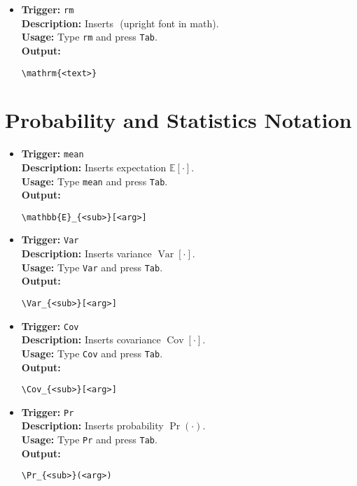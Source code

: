 \documentclass{article}
\DeclareMathOperator{\Var}{Var}
\DeclareMathOperator{\Cov}{Cov}
\begin{document}
\begin{itemize}[leftmargin=*, label={}]
\item \textbf{Trigger:} \texttt{rm} \\
\textbf{Description:} Inserts \(\mathrm{}\) (upright font in math). \\
\textbf{Usage:} Type \texttt{rm} and press \texttt{Tab}. \\
\textbf{Output:}
\begin{verbatim}
\mathrm{<text>}
\end{verbatim}
\end{itemize}

\section{Probability and Statistics Notation}
\begin{itemize}[leftmargin=*, label={}]
\item \textbf{Trigger:} \texttt{mean} \\
\textbf{Description:} Inserts expectation \(\mathbb{E}[\cdot]\). \\
\textbf{Usage:} Type \texttt{mean} and press \texttt{Tab}. \\
\textbf{Output:}
\begin{verbatim}
\mathbb{E}_{<sub>}[<arg>]
\end{verbatim}

\item \textbf{Trigger:} \texttt{Var} \\
\textbf{Description:} Inserts variance \(\Var[\cdot]\). \\
\textbf{Usage:} Type \texttt{Var} and press \texttt{Tab}. \\
\textbf{Output:}
\begin{verbatim}
\Var_{<sub>}[<arg>]
\end{verbatim}

\item \textbf{Trigger:} \texttt{Cov} \\
\textbf{Description:} Inserts covariance \(\Cov[\cdot]\). \\
\textbf{Usage:} Type \texttt{Cov} and press \texttt{Tab}. \\
\textbf{Output:}
\begin{verbatim}
\Cov_{<sub>}[<arg>]
\end{verbatim}

\item \textbf{Trigger:} \texttt{Pr} \\
\textbf{Description:} Inserts probability \(\Pr(\cdot)\). \\
\textbf{Usage:} Type \texttt{Pr} and press \texttt{Tab}. \\
\textbf{Output:}
\begin{verbatim}
\Pr_{<sub>}(<arg>)
\end{verbatim}


\end{itemize}
\end{document}

